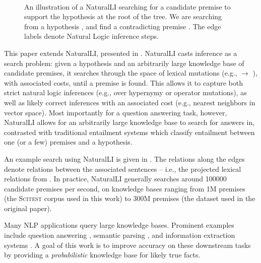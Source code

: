 %
%

\begin{figure}[t]
\begin{center}
  \resizebox{0.48\textwidth}{!}{\teaserSearch} \\
\end{center}
\caption{
  An illustration of a NaturalLI searching for a candidate premise
  to support the hypothesis at the root of the tree.
  We are searching from a hypothesis
  , and find a contradicting
  premise .
  The edge labels denote Natural Logic inference steps.
  \label{fig:naturalli}
}
\end{figure}

This paper extends NaturalLI, presented in .
NaturalLI casts inference as a search problem: given a hypothesis and an arbitrarily
  large knowledge base of candidate premises, it searches through the space of
  lexical mutations (e.g.,  $\rightarrow$ ), 
  with associated costs, until a premise is found.
This allows it to capture both strict natural logic inferences (e.g., over hypernymy
  or operator mutations), as well as likely correct inferences with an associated
  cost (e.g., nearest neighbors in vector space).
Most importantly for a question answering task, however, NaturalLI allows for an
  arbitrarily large knowledge base to search for answers in, contrasted with traditional
  entailment systems which classify entailment between one (or a few) premises and a
  hypothesis.

An example search using NaturalLI is given in .
The relations along the edges denote relations between the associated sentences
  -- i.e., the projected lexical relations from .
In practice, NaturalLI generally searches around \num{100000} candidate premises
  per second, on knowledge bases ranging from 1M premises (the \textsc{Scitest}
  corpus used in this work) to 300M premises (the dataset used in the original paper).

%
%
Many NLP applications query large knowledge bases.
Prominent examples include
  question answering
    \cite{key:2001voorhees-trec},
  semantic parsing
    \cite{key:1996zelle-semantics,key:2007zettlemoyer-semantics,key:2013kwiatkowski-semantics,key:2014berant-semantics},
  and information extraction systems
    \cite{key:2011hoffman-kbp,key:2012surdeanu-mimlre}.
A goal of this work is to improve accuracy on these
  downstream tasks by providing a \textit{probabilistic} knowledge base
  for
  likely true facts.

